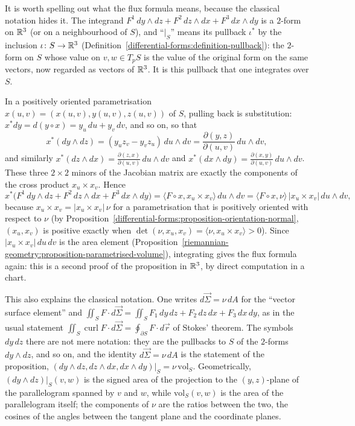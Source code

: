 \begin{remark}\label{riemannian-geometry:remark-flux-pullback}
It is worth spelling out what the flux formula means, because the classical notation hides it. The integrand $F^1\,dy \wedge dz + F^2\,dz \wedge dx + F^3\,dx \wedge dy$ is a $2$-form on $\mathbb{R}^3$ (or on a
neighbourhood of $S$), and ``$|_S$'' means its pullback $\iota^*$ by the inclusion $\iota \colon S \to \mathbb{R}^3$ (Definition~\ref{differential-forms:definition-pullback}): the $2$-form on $S$ whose value on
$v, w \in T_pS$ is the value of the original form on the same vectors, now regarded as vectors of $\mathbb{R}^3$. It is this pullback that one integrates over $S$.

In a positively oriented parametrisation $x(u, v) = (x(u, v), y(u, v), z(u, v))$ of $S$, pulling back is substitution: $x^*dy = d(y \circ x) = y_u\,du + y_v\,dv$, and so on, so that
\[
x^*(dy \wedge dz) = (y_uz_v - y_vz_u)\,du \wedge dv = \frac{\partial(y, z)}{\partial(u, v)}\,du \wedge dv,
\]
and similarly $x^*(dz \wedge dx) = \frac{\partial(z, x)}{\partial(u, v)}\,du \wedge dv$ and $x^*(dx \wedge dy) = \frac{\partial(x, y)}{\partial(u, v)}\,du \wedge dv$. These three $2 \times 2$ minors of the Jacobian matrix are
exactly the components of the cross product $x_u \times x_v$. Hence
\[
x^*\bigl(F^1\,dy \wedge dz + F^2\,dz \wedge dx + F^3\,dx \wedge dy\bigr) = \langle F \circ x, x_u \times x_v\rangle\,du \wedge dv = \langle F \circ x, \nu\rangle\,|x_u \times x_v|\,du \wedge dv,
\]
because $x_u \times x_v = |x_u \times x_v|\,\nu$ for a parametrisation that is positively oriented with respect to $\nu$ (by Proposition~\ref{differential-forms:proposition-orientation-normal},
$(x_u, x_v)$ is positive exactly when $\det(\nu, x_u, x_v) = \langle\nu, x_u \times x_v\rangle > 0$). Since $|x_u \times x_v|\,du\,dv$ is the area element
(Proposition~\ref{riemannian-geometry:proposition-parametrised-volume}), integrating gives the flux formula again: this is a second proof of the proposition in $\mathbb{R}^3$, by direct computation in a chart.

This also explains the classical notation. One writes $d\vec\Sigma = \nu\,dA$ for the ``vector surface element'' and $\iint_SF \cdot d\vec\Sigma = \iint_SF_1\,dy\,dz + F_2\,dz\,dx + F_3\,dx\,dy$, as in the usual statement
$\iint_S\operatorname{curl}F \cdot d\vec\Sigma = \oint_{\partial S}F \cdot d\vec r$ of Stokes' theorem. The symbols $dy\,dz$ there are not mere notation: they are the pullbacks to $S$ of the $2$-forms $dy \wedge dz$, and so
on, and the identity $d\vec\Sigma = \nu\,dA$ is the statement of the proposition, $(dy \wedge dz, dz \wedge dx, dx \wedge dy)|_S = \nu\,\mathrm{vol}_S$. Geometrically, $(dy \wedge dz)|_S(v, w)$ is the signed area of
the projection to the $(y, z)$-plane of the parallelogram spanned by $v$ and $w$, while $\mathrm{vol}_S(v, w)$ is the area of the parallelogram itself; the components of $\nu$ are the ratios between
the two, the cosines of the angles between the tangent plane and the coordinate planes.
\end{remark}

